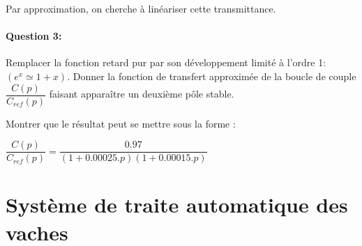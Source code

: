 Par approximation, on cherche à linéariser cette transmittance.

\paragraph{Question 3:} Remplacer la fonction retard pur par son développement limité à l'ordre 1: $(e^x\simeq 1+x)$. Donner la fonction de transfert approximée de la boucle de couple $\dfrac{C(p)}{C_{ref}(p)}$ faisant apparaître un deuxième pôle stable.

Montrer que le résultat peut se mettre sous la forme :

$\dfrac{C(p)}{C_{ref}(p)}=\dfrac{0.97}{(1+0.00025.p)(1+0.00015.p)}$

\iffalse

\paragraph{Question 4:} Tracer le diagramme de Bode asymptotique en gain et en phase de la fonction de transfert linéarisée
$\dfrac{C(p)}{C_{ref}(p)}=\dfrac{0.97}{(1+0.00025.p)(1+0.00015.p)}$ en fonction de la pulsation $\omega$ ($rad.s^{-1})$. On précisera sur le diagramme les pentes, le gain statique (sous la forme 20log(cste)) et les valeurs des phases.

Un essai en régime harmonique sur le Triptéor de la boucle de couple a donné le diagramme de Bode en phase de la figure.

\begin{center}
 \texttt{[image: img/img22]}
\end{center}

Nota : Le résultat de l'analyse harmonique fourni par la C.N. 840D est compris entre +/- 180°.

La phase réelle comprise entre 2kHz et 4kHz est bien sur comprise entre -180° et -360°.

La phase est fournie en fonction de la fréquence f (Hz).

\paragraph{Question 5:} L'évolution de la phase obtenue ci-dessus est-elle identique à celle du diagramme de Bode obtenue à la question 4 ? Argumenter votre réponse.

\fi

\newpage

\section{Système de traite automatique des vaches}

